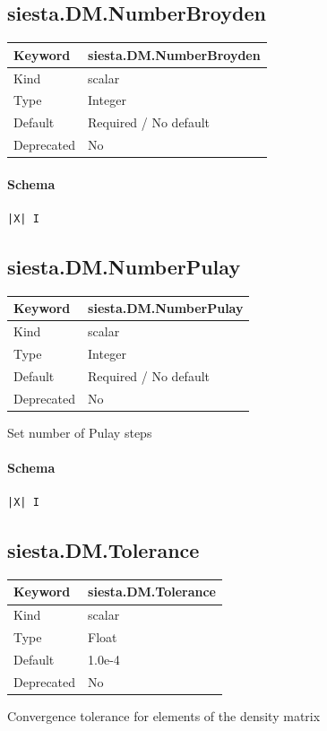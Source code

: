 \documentclass[11pt]{article}
\begin{document}
{{{{{\subsection{siesta.DM.NumberBroyden}
\label{kw:siesta-DM-NumberBroyden}
\begin{longtable}{|p{1.5in}|p{4.5in}|}
\hline
Keyword & siesta.DM.NumberBroyden \\
\hline
Kind & scalar \\
\hline
Type & Integer \\
\hline
Default & Required / No default \\
\hline
Deprecated & No \\
\hline
\end{longtable}
\paragraph{Schema}
\begin{Verbatim}
|X| I
\end{Verbatim}

\subsection{siesta.DM.NumberPulay}
\label{kw:siesta-DM-NumberPulay}
\begin{longtable}{|p{1.5in}|p{4.5in}|}
\hline
Keyword & siesta.DM.NumberPulay \\
\hline
Kind & scalar \\
\hline
Type & Integer \\
\hline
Default & Required / No default \\
\hline
Deprecated & No \\
\hline
\end{longtable}
 Set number of Pulay steps

\paragraph{Schema}
\begin{Verbatim}
|X| I
\end{Verbatim}

\subsection{siesta.DM.Tolerance}
\label{kw:siesta-DM-Tolerance}
\begin{longtable}{|p{1.5in}|p{4.5in}|}
\hline
Keyword & siesta.DM.Tolerance \\
\hline
Kind & scalar \\
\hline
Type & Float \\
\hline
Default & 1.0e-4 \\
\hline
Deprecated & No \\
\hline
\end{longtable}
 Convergence tolerance for elements of the density matrix

}}}}}
\end{document}
